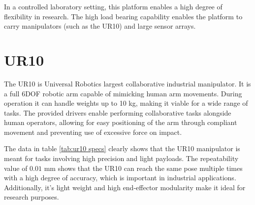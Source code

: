 \documentclass[times, utf8, diplomski, english]{fer}
\begin{document}
In a controlled laboratory setting, this platform enables a high degree of flexibility in research.
The high load bearing capability enables the platform to carry manipulators (such as the UR10) and large sensor arrays.

\newpage
\section{UR10} 
The UR10 is Universal Robotics largest collaborative industrial manipulator.
It is a full 6DOF robotic arm capable of mimicking human arm movements.
During operation it can handle weights up to 10 kg, making it viable for a wide range of tasks.
The provided drivers enable performing collaborative tasks alongside human operators, allowing for easy positioning of the arm through compliant movement and preventing use of excessive force on impact.
\begin{figure}[h]
\begin{floatrow}
\end{floatrow}
\end{figure}

The data in table \autoref{tab:ur10 specs} clearly shows that the UR10 manipulator is meant for tasks involving high precision and light payloads. 
The repeatability value of $0.01$ mm shows that the UR10 can reach the same pose multiple times with a high degree of accuracy, which is important in industrial applications.
Additionally, it's light weight and high end-effector modularity make it ideal for research purposes.
\end{document}
